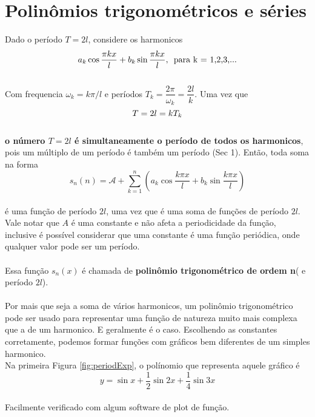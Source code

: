 \chapter{Polinômios trigonométricos e séries}
Dado o período $T=2l$, considere os harmonicos\\
\begin{equation}
    a_k\cos{\dfrac{\pi kx}{l}} + b_k\sin{\dfrac{\pi kx}{l}},\text{\hspace{5pt}para k = 1,2,3,...}
\end{equation}
\\
Com frequencia $\omega_k = k\pi/l$ e períodos $T_k = \dfrac{2\pi}{\omega_k} = \dfrac{2l}{k}$. 
Uma vez que 
\begin{equation}
\notag
    T = 2l = kT_k
\end{equation}  
\\
\textbf{o número $T=2l$ é simultaneamente o período de todos os harmonicos},
pois um múltiplo de um período é também um período (Sec 1). Então, toda soma na 
forma\\
\begin{equation}
    s_n(n) = \mathcal{A} + \sum\limits_{k=1}^{n}(a_k\cos{\dfrac{k\pi x}{l} + b_k\sin{\dfrac{k\pi x}{l}}})
\end{equation}
\\
é uma função de período $2l$, uma vez que é uma soma de funções de período 
$2l$. Vale notar que $A$ é uma constante e não afeta a periodicidade da função,
inclusive é possível considerar que uma constante é uma função periódica, onde 
qualquer valor pode ser um período.\\
\\
Essa função $s_n(x)$ é chamada  de \textbf{polinômio trigonométrico de ordem n}(
e período $2l$).\\
\\
Por mais que seja a soma de vários harmonicos, um polinômio trigonométrico pode 
ser usado para representar uma função de natureza muito mais complexa que a 
de um harmonico. E geralmente é o caso. Escolhendo as constantes corretamente,
podemos formar funções com gráficos bem diferentes de um simples harmonico.
\\
Na primeira Figura \ref{fig:periodExp}, o polínomio que representa aquele gráfico é\\
\begin{equation}
    y = \sin{x} + \dfrac{1}{2}\sin{2x} + \dfrac{1}{4}\sin{3x}
\end{equation}
\\
Facilmente verificado com algum software de plot de função.\\
\\

